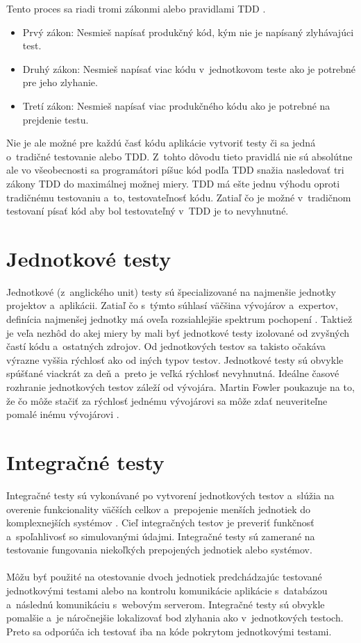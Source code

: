 \documentclass[
  digital, %
  table,   %
oneside,
  nolof,     %
  nolot,     %
]{fithesis3}
\begin{document}
Tento proces sa riadi tromi zákonmi alebo pravidlami TDD \cite{cleanCode}.
\begin{itemize}
	\item Prvý zákon: Nesmieš napísať produkčný kód, kým nie je napísaný zlyhávajúci test.
	\item Druhý zákon: Nesmieš napísať viac kódu v~jednotkovom teste ako je potrebné pre jeho zlyhanie.
	\item Tretí zákon: Nesmieš napísať viac produkčného kódu ako je potrebné na prejdenie testu. 
\end{itemize} 
Nie je ale možné pre každú časť kódu aplikácie vytvoriť testy či sa jedná o~tradičné testovanie alebo TDD. Z~tohto dôvodu tieto pravidlá nie sú absolútne ale vo všeobecnosti sa programátori píšuc kód podľa TDD snažia nasledovať tri zákony TDD do maximálnej možnej miery.
TDD má ešte jednu výhodu oproti tradičnému testovaniu a~to, testovateľnosť kódu. Zatiaľ čo je možné v~tradičnom testovaní písať kód aby bol testovateľný v~TDD je to nevyhnutné. 

\section{Jednotkové testy}
Jednotkové (z~anglického unit) testy sú špecializované na najmenšie jednotky projektov a~aplikácii. Zatiaľ čo s~týmto súhlasí väčšina vývojárov a~expertov, definícia najmenšej jednotky má oveľa rozsiahlejšie spektrum pochopení \cite{codeMaintability}\cite{effectiveSoftwareTesting}. Taktiež je veľa nezhôd do akej miery by mali byť jednotkové testy izolované od zvyšných častí kódu a~ostatných zdrojov. Od jednotkových testov sa takisto očakáva výrazne vyššia rýchlosť ako od iných typov testov. Jednotkové testy sú obvykle spúšťané viackrát za deň a~preto je veľká rýchlosť nevyhnutná. Ideálne časové rozhranie jednotkových testov záleží od vývojára. Martin Fowler poukazuje na to, že čo môže stačiť za rýchlosť jednému vývojárovi sa môže zdať neuveriteľne pomalé inému vývojárovi \cite{unitTest}.
\section{Integračné testy}
Integračné testy sú vykonávané po vytvorení jednotkových testov a~slúžia na overenie funkcionality väčších celkov a~prepojenie menších jednotiek do komplexnejších systémov \cite{testSeparation}. Cieľ integračných testov je preveriť funkčnosť a~spoľahlivosť so simulovanými údajmi. Integračné testy sú zamerané na testovanie fungovania niekoľkých prepojených jednotiek alebo systémov.\paragraph{}
Môžu byť použité na otestovanie dvoch jednotiek predchádzajúc testované jednotkovými testami alebo na kontrolu komunikácie aplikácie s~databázou a~následnú komunikáciu s~webovým serverom. Integračné testy sú obvykle pomalšie a~je náročnejšie lokalizovať bod zlyhania ako v~jednotkových  testoch. Preto sa odporúča ich testovať iba na kóde pokrytom jednotkovými testami.
\end{document}
